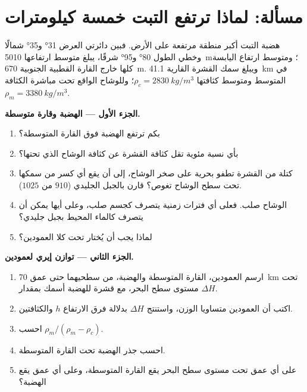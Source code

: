 \section{مسألة: لماذا ترتفع التبت خمسة كيلومترات}

\begin{problem}
\label{pb:g11:lithosphere-asthenosphere:1}
هضبة التبت أكبر منطقة مرتفعة على الأرض. فبين دائرتي العرض
\ang{31} و\ang{35} شمالًا وخطي الطول \ang{80} و\ang{95} شرقًا، يبلغ
متوسط ارتفاعها \qty{5010}{m}؛ ومتوسط ارتفاع اليابسة كلها خارج
القارة القطبية الجنوبية \qty{670}{m}. ويبلغ سمك القشرة القارية \qty{41.1}{km} في
المتوسط ومتوسط كثافتها $\rho_c = \qty{2830}{kg/m^3}$؛ وللوشاح الواقع
تحت  مباشرة الكثافة $\rho_m = \qty{3380}{kg/m^3}$.

\medskip
\noindent\textbf{الجزء الأول --- الهضبة وقارة متوسطة.}
\begin{enumerate}
  \item بكم ترتفع الهضبة فوق القارة المتوسطة؟
  \item بأي نسبة مئوية تقل كثافة القشرة عن كثافة الوشاح الذي تحتها؟
  \item كتلة من القشرة تطفو بحرية على صخر الوشاح، إلى أن يقع أي
        كسر من سمكها تحت سطح الوشاح تغوص؟ قارن
        بالجبل الجليدي ($910$ من $1025$).
  \item الوشاح صلب. فعلى أي فترات زمنية يتصرف
        كجسم صلب، وعلى أيها يمكن أن يتصرف كالماء المحيط
        بجبل جليدي؟
  \item لماذا يجب أن يُختار  تحت  كلا
        العمودين؟
\end{enumerate}

\medskip
\noindent\textbf{الجزء الثاني --- توازن إيري لعمودين.}
\begin{enumerate}[resume]
  \item ارسم العمودين، القارة المتوسطة والهضبة، من
        سطحيهما حتى عمق \qty{70}{km} تحت مستوى سطح البحر، مع
        قشرة للهضبة أسمك بمقدار $\Delta H$.
  \item اكتب أن العمودين متساويا الوزن، واستنتج $\Delta H$ بدلالة
        فرق الارتفاع $h$ والكثافتين.
  \item احسب $\rho_m/(\rho_m - \rho_c)$.
  \item احسب جذر الهضبة تحت  القارة
        المتوسطة.
  \item على أي عمق تحت مستوى سطح البحر يقع  القارة المتوسطة، وعلى
        أي عمق يقع  الهضبة؟
\end{enumerate}


\end{problem}

